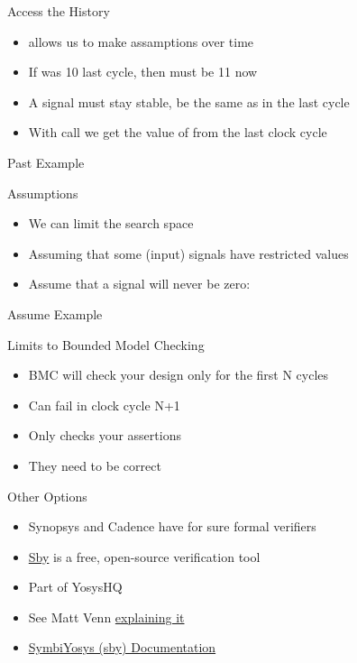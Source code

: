 \begin{frame}[fragile]{Access the History}
\begin{itemize}
\item {} allows us to make assamptions over time
\item If  was 10 last cycle, then  must be 11 now
\item A signal must stay stable, be the same as in the last cycle
\item With  call we get the value of  from the last clock cycle
\end{itemize}
\end{frame}

\begin{frame}[fragile]{Past Example}
\end{frame}

\begin{frame}[fragile]{Assumptions}
\begin{itemize}
\item We can limit the search space
\item Assuming that some (input) signals have restricted values
\item Assume that a signal will never be zero:
\end{itemize}
\end{frame}

\begin{frame}[fragile]{Assume Example}
\end{frame}

\begin{frame}[fragile]{Limits to Bounded Model Checking}
\begin{itemize}
\item BMC will check your design only for the first N cycles
\item Can fail in clock cycle N+1
\item Only checks your assertions
\item They need to be correct
\end{itemize}
\end{frame}

\begin{frame}[fragile]{Other Options}
\begin{itemize}
\item Synopsys and Cadence have for sure formal verifiers
\item \href{https://github.com/YosysHQ/sby}{Sby} is a free, open-source verification tool
\item Part of YosysHQ
\item See Matt Venn \href{https://www.youtube.com/watch?v=B1KX2rFJqVE}{explaining it}
\item \href{https://symbiyosys.readthedocs.io/en/latest/index.html}{SymbiYosys (sby) Documentation}
\end{itemize}
\end{frame}

